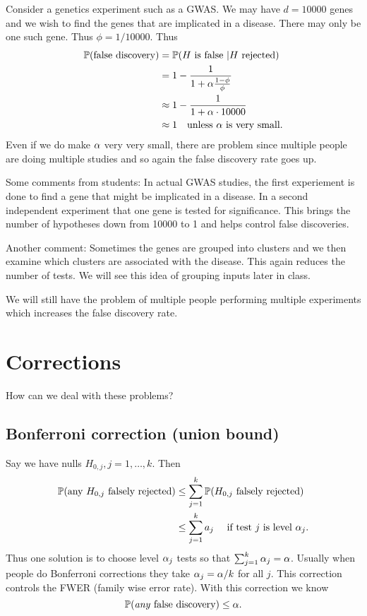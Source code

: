 \begin{ex}
    Consider a genetics experiment such as a GWAS. We may have $d=10000$ genes and we wish to find the genes that are implicated in a disease. There may only be one such gene.  Thus $\phi = 1/10000$. Thus 
    \begin{align*}
        {\mathbb{P}}(\text{false discovery})&= {\mathbb{P}}(H \text{ is false }| H \text{ rejected})\\
        &= 1-\frac{1}{1+{\alpha}\frac{1-\phi}{\phi}}\\
        &\approx 1-\frac{1}{1+{\alpha}\cdot 10000}\\
        &\approx 1 \quad \text{unless ${\alpha}$ is very small}.
    \end{align*}
    Even if we do make ${\alpha}$ very very small, there are problem since multiple people are doing multiple studies and so  again the false discovery rate goes up. 

    Some comments from students: In actual GWAS studies, the first experiement is done to find a gene that might be implicated in a disease. In a second independent experiment that one gene is tested for significance. This brings the number of hypotheses down from 10000 to 1 and helps control false discoveries.

    Another comment: Sometimes the genes are grouped into clusters and we then examine which clusters are associated with the disease. This again reduces the number of tests. We will see this idea of grouping inputs later in class.

    We will still have the problem of multiple people performing multiple experiments which increases the false discovery rate.
\end{ex}
\section{Corrections}
How can we deal with these problems?

\subsection{Bonferroni correction (union bound)}
Say we have nulls $H_{0,j}, j = 1,\ldots,k$. Then 
\begin{align*}
    {\mathbb{P}}(\text{any } H_{0,j} \text{ falsely rejected})& \le \sum_{j=1}^k {\mathbb{P}}(H_{0,j} \text{ falsely rejected})\\
    &\le \sum_{j=1}^k a_j \quad \text{ if test $j$ is level ${\alpha}_j$}.
\end{align*}
Thus one solution is to choose level ${\alpha}_j$ tests so that $\sum_{j=1}^k {\alpha}_j = {\alpha}$. Usually when people do Bonferroni corrections they take ${\alpha}_j = {\alpha}/k$ for all $j$. This correction controls the FWER (family wise error rate). With this correction we know 
\[{\mathbb{P}}(\text{\emph{any} false discovery}) \le {\alpha}. \]
